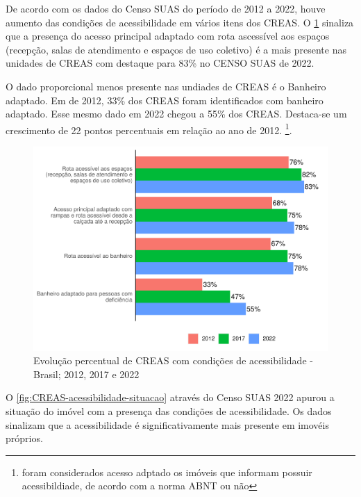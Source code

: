 \documentclass[
  brazilian]{report}
\begin{document}
De acordo com os dados do Censo SUAS do período de 2012 a 2022, houve
aumento das condições de acessibilidade em vários itens dos CREAS. O
\cref{fig:creas-acessibilidade} sinaliza que a presença do acesso
principal adaptado com rota ascessível aos espaços (recepção, salas de
atendimento e espaços de uso coletivo) é a mais presente nas unidades de
CREAS com destaque para 83\% no CENSO SUAS de 2022.

O dado proporcional menos presente nas undiades de CREAS é o Banheiro
adaptado. Em de 2012, 33\% dos CREAS foram identificados com banheiro
adaptado. Esse mesmo dado em 2022 chegou a 55\% dos CREAS. Destaca-se um
crescimento de 22 pontos percentuais em relação ao ano de 2012.
\footnote{foram considerados acesso adptado os imóveis que informam possuir acessibildiade, de acordo com a norma ABNT ou não}.

\begin{figure}
\includegraphics{Censo-SUAS-2022_files/figure-latex/creas-acessibilidade-1} \caption[Evolução percentual de CREAS com condições de acessibilidade - Brasil]{Evolução percentual de CREAS com condições de acessibilidade - Brasil; 2012, 2017 e 2022}\label{fig:creas-acessibilidade}
\end{figure}

O \cref{fig:CREAS-acessibilidade-situacao} através do Censo SUAS 2022
apurou a situação do imóvel com a presença das condições de
acessibilidade. Os dados sinalizam que a acessibilidade é
significativamente mais presente em imovéis próprios.
\end{document}
